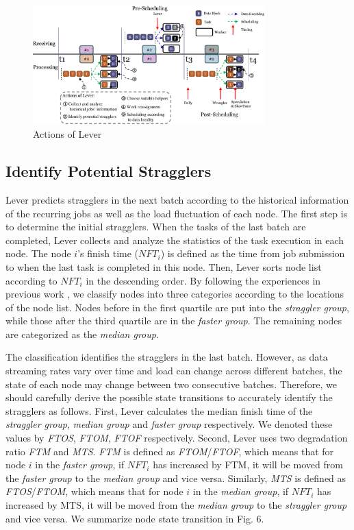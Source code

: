   \begin{figure}[htbp]
    \centering
    \includegraphics[width=0.8\textwidth]{FigureAction}
    \caption{Actions of Lever}
    \label{Fig. 5:}
  \end{figure}

\subsection{Identify Potential Stragglers}

Lever predicts stragglers in the next batch according to the historical information
of the recurring jobs as well as the load fluctuation of each node. The first
step is to determine the initial stragglers. When the tasks of the last batch are
completed, Lever collects and analyze the statistics of the task execution
in each node. The node $i$'s finish time ($NFT_i$) is defined as the time from
job submission to when the last task is completed in this node.  Then, Lever sorts node
list according to $NFT_i$ in the descending order. By following the experiences
in previous work \cite{Dean2004}, we classify nodes into three
categories according to the locations of the node list. Nodes before in the
first quartile are put into the \emph{straggler group}, while those after the third 
quartile are in the \emph{faster group}. The remaining nodes are categorized as
the \emph{median group}.

The classification identifies the stragglers in the last batch. However, 
as data streaming rates vary over time and load can change across different
batches,  the state of each node may change between two consecutive batches.
Therefore, we should carefully derive the possible state transitions to
accurately identify the stragglers as follows.  First, Lever calculates the
median finish time of the \emph{straggler group}, \emph{median group} and
\emph{faster group} respectively. We denoted these values by \emph{FTOS}, \emph{FTOM},
\emph{FTOF} respectively. Second, Lever uses two degradation ratio \emph{FTM} and
\emph{MTS}. \emph{FTM} is defined as \emph{FTOM}/\emph{FTOF}, which means that 
for node $i$ in the \emph{faster group}, if $NFT_i$ 
has increased by FTM, it will be moved
from the \emph{faster group} to the \emph{median group} and vice versa.
Similarly, \emph{MTS} is defined as \emph{FTOS}/\emph{FTOM}, which means that
for node $i$ in the \emph{median group}, if $NFT_i$ has increased by MTS, it will be moved
from the \emph{median group} to the \emph{straggler group} and vice versa. We
summarize node state transition in Fig. 6.  

